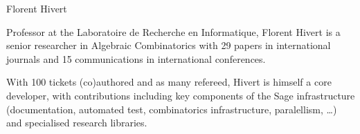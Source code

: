 \begin{participant}[type=PI,PM=6,salary=9000,gender=male]{Florent Hivert}

  Professor at the Laboratoire de Recherche en Informatique, Florent Hivert is a senior
  researcher in Algebraic Combinatorics with 29 papers in international journals and 15
  communications in international conferences.

With 100 tickets (co)authored and as many refereed, Hivert is himself a core \Sage
developer, with contributions including key components of the Sage infrastructure
(documentation, automated test, combinatorics infrastructure, paralellism, \ldots)
and specialised research libraries.
\end{participant}
